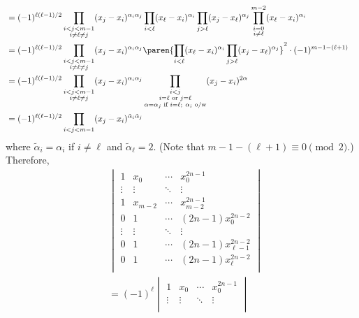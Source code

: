 \documentclass{homework}
\begin{document}
{\begin{align*}
    \\&= (-1)^{\ell(\ell-1)/2} \prod_{\substack{i<j<m-1 \\ i\ne \ell\ne j}} (x_j-x_i)^{\alpha_i\alpha_j}\prod_{\substack{i<\ell}} (x_\ell-x_i)^{\alpha_i}\prod_{\substack{j>\ell}} (x_j-x_\ell)^{\alpha_j}\prod_{\substack{i=0\\i\ne \ell }}^{m-2} (x_\ell-x_i)^{\alpha_i}
    \\&= (-1)^{\ell(\ell-1)/2} \prod_{\substack{i<j<m-1 \\ i\ne \ell\ne j}} (x_j-x_i)^{\alpha_i\alpha_j}\paren{\prod_{\substack{i<\ell}} (x_\ell-x_i)^{\alpha_i}\prod_{\substack{j>\ell}} (x_j-x_\ell)^{\alpha_j}}^2 \cdot (-1)^{m-1-(\ell+1)}
    \\&= (-1)^{\ell(\ell-1)/2} \prod_{\substack{i<j<m-1 \\ i\ne \ell\ne j}} (x_j-x_i)^{\alpha_i\alpha_j}\prod_{\substack{i<j\\i=\ell\text{ or }j=\ell\\ \alpha =\alpha_j\text{ if }i=\ell;\ \alpha_i\text{ o/w}}} (x_j-x_i)^{2\alpha}
    \\&= (-1)^{\ell(\ell-1)/2} \prod_{\substack{i<j<m-1}} (x_j-x_i)^{\tilde\alpha_i\tilde\alpha_j}
\end{align*}
where $\tilde \alpha_i = \alpha_i$ if $i\ne \ell$ and $\tilde\alpha_\ell = 2$. (Note that $m-1-(\ell+1) \equiv 0\pmod 2$.) Therefore,
\begin{align*}
     & \begin{vmatrix}
        1      & x_0     & \cdots & x_0^{2n-1}               \\
        \vdots & \vdots  & \ddots & \vdots                   \\
        1      & x_{m-2} & \cdots & x_{m-2}^{2n-1}           \\
        0      & 1       & \cdots & (2n-1) x_0^{2n-2}        \\
        \vdots & \vdots  & \ddots & \vdots                   \\
        0      & 1       & \cdots & (2n-1) x_{\ell-1}^{2n-2} \\
        0      & 1       & \cdots & (2n-1) x_\ell^{2n-2}     \\
    \end{vmatrix}
    \\&= (-1)^{\ell} \begin{vmatrix}
        1      & x_0     & \cdots & x_0^{2n-1}               \\
        \vdots & \vdots  & \ddots & \vdots                   \\

\end{vmatrix}
\end{align*}}
\end{document}
